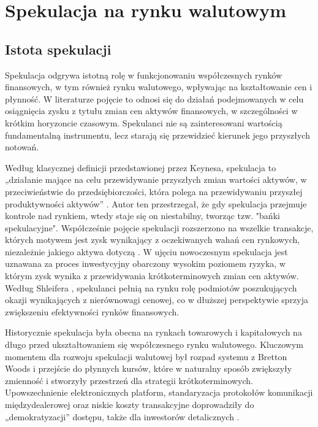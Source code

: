 \chapter{Spekulacja na rynku walutowym}

\section{Istota spekulacji}
Spekulacja odgrywa istotną rolę w funkcjonowaniu współczesnych rynków finansowych, w tym również rynku walutowego, wpływając na kształtowanie cen i płynność. 
W literaturze pojęcie to odnosi się do działań podejmowanych w celu osiągnięcia zysku z tytułu zmian cen aktywów finansowych, w szczególności w krótkim horyzoncie czasowym. 
Spekulanci nie są zainteresowani wartością fundamentalną instrumentu, lecz starają się przewidzieć kierunek jego przyszłych notowań.

Według klasycznej definicji przedstawionej przez Keynesa, spekulacja to „działanie mające na celu przewidywanie przyszłych zmian wartości aktywów, w przeciwieństwie do przedsiębiorczości, 
która polega na przewidywaniu przyszłej produktywności aktywów” \parencite{keynes1936}. 
Autor ten przestrzegał, że gdy spekulacja przejmuje kontrole nad rynkiem, wtedy staje się on niestabilny, tworząc tzw. "bańki spekulacyjne".
Współcześnie pojęcie spekulacji rozszerzono na wszelkie transakcje, których motywem jest zysk wynikający z oczekiwanych wahań cen rynkowych, niezależnie jakiego aktywa dotyczą \parencite{hull2018}. 
W ujęciu nowoczesnym spekulacja jest uznawana za proces inwestycyjny obarczony wysokim poziomem ryzyka, w którym zysk wynika z przewidywania krótkoterminowych zmian cen aktywów. 
Według Shleifera \parencite{shleifer2000}, spekulanci pełnią na rynku rolę podmiotów poszukujących okazji wynikających z nierównowagi cenowej, 
co w dłuższej perspektywie sprzyja zwiększeniu efektywności rynków finansowych.

Historycznie spekulacja była obecna na rynkach towarowych i kapitałowych na długo przed ukształtowaniem się współczesnego rynku walutowego. 
Kluczowym momentem dla rozwoju spekulacji walutowej był rozpad systemu z Bretton Woods i przejście do płynnych kursów, 
które w naturalny sposób zwiększyły zmienność i stworzyły przestrzeń dla strategii krótkoterminowych. 
Upowszechnienie elektronicznych platform, standaryzacja protokołów komunikacji międzydealerowej oraz niskie koszty transakcyjne doprowadziły do „demokratyzacji” dostępu, także dla inwestorów detalicznych \parencite{hull2018}.

